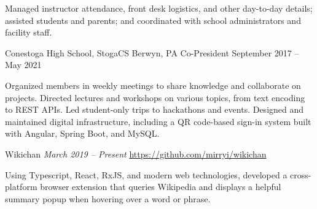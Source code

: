 \documentclass[letterpaper,11pt]{article}
\begin{document}
\begin{rsectionlist}
      Managed instructor attendance, front desk logistics, and other day-to-day details; assisted
      students and parents; and coordinated with school administrators and facility staff.

    \rsectionitem
      {Conestoga High School, StogaCS}
      {Berwyn, PA}
      {Co-President}
      {September 2017 -- May 2021}

      Organized members in weekly meetings to share knowledge and collaborate on projects. Directed
      lectures and workshops on various topics, from text encoding to REST APIs. Led student-only
      trips to hackathons and events. Designed and maintained digital infrastructure, including a QR
      code-based sign-in system built with Angular, Spring Boot, and MySQL.
  \end{rsectionlist}

  \begin{rsectionlist}
    \rsectionitem
      {Wikichan}
      {\small \itshape March 2019 -- Present}
      {\small \url{https://github.com/mirryi/wikichan}}
      {}

      Using Typescript, React, RxJS, and modern web technologies, developed a cross-platform browser
      extension that queries Wikipedia and displays a helpful summary popup when hovering over a
      word or phrase.


  \end{rsectionlist}
\end{document}
